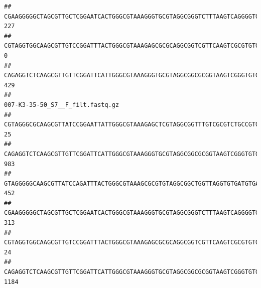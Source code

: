 \documentclass[]{article}
\begin{document}
\begin{verbatim}
## CGAAGGGGGCTAGCGTTGCTCGGAATCACTGGGCGTAAAGGGTGCGTAGGCGGGTCTTTAAGTCAGGGGTGAAATCCTGGAGCTCAACTCCAGAACTGCCTTTGATACTGAAGATCTTGAGTTCGGGAGAGGTGAGTGGAACTGCGAGTGTAGAGGTGAAATTCGTAGATATTCGCAAGAACACCAGTGGCGAAGGCGGCTCACTGGCCCGATACTGACGCTGAGGCACGAAAGCGTGGGGAGCAAACA                              227
## CGTAGGTGGCAAGCGTTGTCCGGATTTACTGGGCGTAAAGAGCGCGCAGGCGGTCGTTCAAGTCGCGTGTGAAAGCCCCCGGCTCAACTGGGGAGGGTCACGCGATACTGATCGACTCGAAGGCAGGAGAGGGTAGTGGAATTCCCGGTGTAGTGGTGAAATGCGTAGATATCGGGAGGAACACCAGTGGCGAAGGCGACTACCTGGCCTGTTCTTGACGCTGAGGCGCGAAAGCTAGGGGAGCAAACG                                0
## CAGAGGTCTCAAGCGTTGTTCGGATTCATTGGGCGTAAAGGGTGCGTAGGCGGCGCGGTAAGTCGGGTGTGAAATCTCGGGGCTTAACTCCGAAACTGCATTCGATACTGCCGTGCTTGAGGACTGGAGAGGAGACTGGAATTTACGGTGTAGCGGTGAAATGCGTAGATATCGTAAGGAAGACCAGTGGCGAAGGCGGGTCTCTGGACAGTTCCTGACGCTGAGGCACGAAGGCCAGGGGAGCAAACG                              429
##                                                                                                                                                                                                                                                           007-K3-35-50_S7__F_filt.fastq.gz
## CGTAGGGCGCAAGCGTTATCCGGAATTATTGGGCGTAAAGAGCTCGTAGGCGGTTTGTCGCGTCTGCCGTGAAAGTCCGGGGCTCAACTCCGGATCTGCGGTGGGTACGGGCAGACTAGAGTGATGTAGGGGAGACTGGAATTCCTGGTGTAGCGGTGAAATGCGCAGATATCAGGAGGAACACCGATGGCGAAGGCAGGTCTCTGGGCATTAACTGACGCTGAGGAGCGAAAGCATGGGGAGCGAACA                               25
## CAGAGGTCTCAAGCGTTGTTCGGATTCATTGGGCGTAAAGGGTGCGTAGGCGGCGCGGTAAGTCGGGTGTGAAATCTCGGAGCTTAACTCCGAAACTGCATTCGATACTGCCGTGCTTGAGGACTGGAGAGGAGACTGGAATTTACGGTGTAGCGGTGAAATGCGTAGATATCGTAAGGAAGACCAGTGGCGAAGGCGGGTCTCTGGACAGTTCCTGACGCTGAGGCACGAAGGCCAGGGGAGCAAACG                              983
## GTAGGGGGCAAGCGTTATCCAGATTTACTGGGCGTAAAGCGCGTGTAGGCGGCTGGTTAGGTGTGATGTGAAATCTTCCGGCTCAACCGGAAAACTGCATTGCAAACCGGCCTGGCTAGAGTGCAGGAGAGGGAAGCGGAATTCCAGGTGTAGCGGTGAAATGCGTAGATATCTGGAGGAACACCAGTGGCGAAGGCGGCTTCCTGGCCTGCAACTGACGCTGAGACGCGAAAGCGTGGGGAGCGAAC                               452
## CGAAGGGGGCTAGCGTTGCTCGGAATCACTGGGCGTAAAGGGTGCGTAGGCGGGTCTTTAAGTCAGGGGTGAAATCCTGGAGCTCAACTCCAGAACTGCCTTTGATACTGAAGATCTTGAGTTCGGGAGAGGTGAGTGGAACTGCGAGTGTAGAGGTGAAATTCGTAGATATTCGCAAGAACACCAGTGGCGAAGGCGGCTCACTGGCCCGATACTGACGCTGAGGCACGAAAGCGTGGGGAGCAAACA                              313
## CGTAGGTGGCAAGCGTTGTCCGGATTTACTGGGCGTAAAGAGCGCGCAGGCGGTCGTTCAAGTCGCGTGTGAAAGCCCCCGGCTCAACTGGGGAGGGTCACGCGATACTGATCGACTCGAAGGCAGGAGAGGGTAGTGGAATTCCCGGTGTAGTGGTGAAATGCGTAGATATCGGGAGGAACACCAGTGGCGAAGGCGACTACCTGGCCTGTTCTTGACGCTGAGGCGCGAAAGCTAGGGGAGCAAACG                               24
## CAGAGGTCTCAAGCGTTGTTCGGATTCATTGGGCGTAAAGGGTGCGTAGGCGGCGCGGTAAGTCGGGTGTGAAATCTCGGGGCTTAACTCCGAAACTGCATTCGATACTGCCGTGCTTGAGGACTGGAGAGGAGACTGGAATTTACGGTGTAGCGGTGAAATGCGTAGATATCGTAAGGAAGACCAGTGGCGAAGGCGGGTCTCTGGACAGTTCCTGACGCTGAGGCACGAAGGCCAGGGGAGCAAACG                             1184

\end{verbatim}
\end{document}
